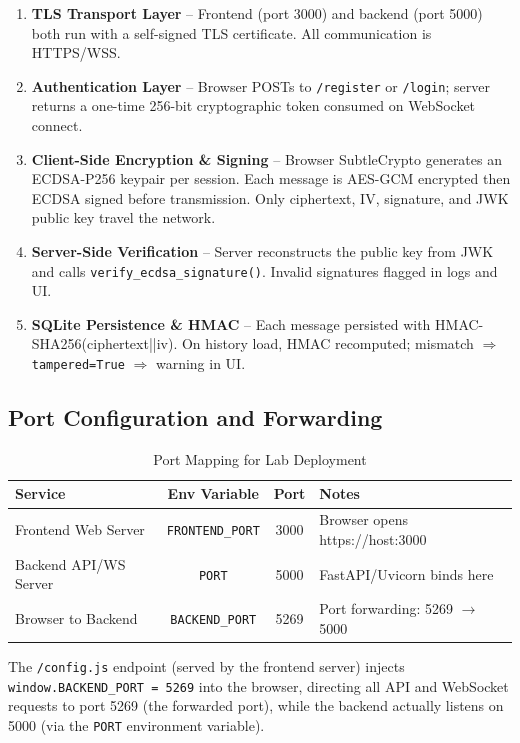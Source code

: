 \documentclass[12pt, a4paper]{article}
\begin{document}
\begin{enumerate}[leftmargin=*]
    \item \textbf{TLS Transport Layer} -- Frontend (port 3000) and backend (port 5000) both run with a self-signed TLS certificate. All communication is HTTPS/WSS.
    \item \textbf{Authentication Layer} -- Browser POSTs to \texttt{/register} or \texttt{/login}; server returns a one-time 256-bit cryptographic token consumed on WebSocket connect.
    \item \textbf{Client-Side Encryption \& Signing} -- Browser SubtleCrypto generates an ECDSA-P256 keypair per session. Each message is AES-GCM encrypted then ECDSA signed before transmission. Only ciphertext, IV, signature, and JWK public key travel the network.
    \item \textbf{Server-Side Verification} -- Server reconstructs the public key from JWK and calls \texttt{verify\_ecdsa\_signature()}. Invalid signatures flagged in logs and UI.
    \item \textbf{SQLite Persistence \& HMAC} -- Each message persisted with HMAC-SHA256(ciphertext||iv). On history load, HMAC recomputed; mismatch $\Rightarrow$ \texttt{tampered=True} $\Rightarrow$ warning in UI.
\end{enumerate}

\subsection{Port Configuration and Forwarding}

\begin{table}[H]
    \centering
    \caption{Port Mapping for Lab Deployment}
    \begin{tabularx}{\textwidth}{l c c X}
        \toprule
        \textbf{Service} & \textbf{Env Variable} & \textbf{Port} & \textbf{Notes} \\
        \midrule
        Frontend Web Server   & \texttt{FRONTEND\_PORT}    & 3000 & Browser opens https://host:3000 \\
        Backend API/WS Server & \texttt{PORT}              & 5000 & FastAPI/Uvicorn binds here \\
        Browser to Backend    & \texttt{BACKEND\_PORT}     & 5269 & Port forwarding: 5269 $\to$ 5000 \\
        \bottomrule
    \end{tabularx}
\end{table}

The \texttt{/config.js} endpoint (served by the frontend server) injects \texttt{window.BACKEND\_PORT = 5269} into the browser, directing all API and WebSocket requests to port 5269 (the forwarded port), while the backend actually listens on 5000 (via the \texttt{PORT} environment variable).
\end{document}
